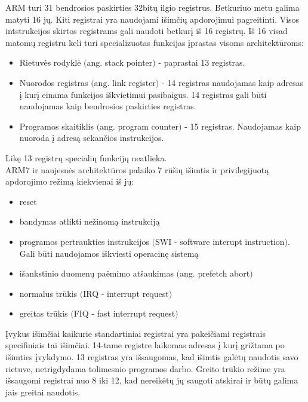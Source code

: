 \documentclass[a4paper, 12pt]{article} %
\begin{document}
\begin{onehalfspacing}
\indent ARM turi 31 bendrosios paskirties 32bit\k{u} ilgio registrus. Betkuriuo metu galima matyti 16 j\k{u}. Kiti registrai yra naudojami i\v{s}im\v{c}i\k{u} apdorojimui pagreitinti. Visos intstrukcijos skirtos registrams gali naudoti betkur\k{i} i\v{s} 16 registr\k{u}. I\v{s} 16 visad matom\k{u} registru keli turi specializuotas funkcijas \k{i}prastas visoms architekt\={u}roms:
\begin{itemize}
\item Rietuv\.{e}s rodykl\.{e} $($ang. stack pointer$)$ - paprastai 13 registras.
\item Nuorodos registras $($ang. link register$)$ - 14 registras naudojamas kaip adresas \k{i} kur\k{i} einama funkcijos i\v{s}kvietimui pasibaigus. 14 registras gali b\={u}ti naudojamas kaip bendrosios paskirties registras.
\item Programos skaitiklis $($ang. program counter$)$ - 15 registras. Naudojamas kaip nuoroda \k{i} adres\k{a} sekan\v{c}ios instrukcijos. 
\end{itemize}
Lik\k{e} 13 registr\k{u} speciali\k{u} funkcij\k{u} neatlieka. \\
\indent ARM7 ir naujesn\.{e}s architekt\={u}ros palaiko 7 r\={u}\v{s}i\k{u} i\v{s}imtis ir privilegijuot\k{a} apdorojimo re\v{z}im\k{a} kiekvienai i\v{s} j\k{u}:
\begin{itemize}
\item reset
\item bandymas atlikti ne\v{z}inom\k{a} instrukcij\k{a}
\item programos pertraukties instrukcijos $($SWI - software interupt instruction$)$. Gali b\={u}ti naudojamos i\v{s}kviesti operacin\k{e} sistem\k{a}
\item i\v{s}ankstinio duomen\k{u} pa\.{e}mimo at\v{s}aukimas $($ang. prefetch abort$)$
\item normalus tr\={u}kis $($IRQ - interrupt request$)$
\item greitas tr\={u}kis $($FIQ - fast interrupt request$)$
\end{itemize}
\k{I}vykus i\v{s}im\v{c}iai kaikurie standartiniai registrai yra pakei\v{c}iami registrais specifiniais tai i\v{s}im\v{c}iai. 14-tame registre laikomas adresas \k{i} kur\k{i} gri\v{z}tama po i\v{s}imties \k{i}vykdymo. 13 registras yra i\v{s}saugomas, kad i\v{s}imtis gal\.{e}t\k{u} naudotis savo rietuve, netrigdydama tolimesnio programos darbo. Greito tr\={u}kio re\v{z}ime yra i\v{s}saugomi registrai nuo 8 iki 12, kad nereik\.{e}t\k{u} j\k{u} saugoti atskirai ir b\={u}t\k{u} galima jais greitai naudotis. \\

\end{onehalfspacing}
\end{document}
